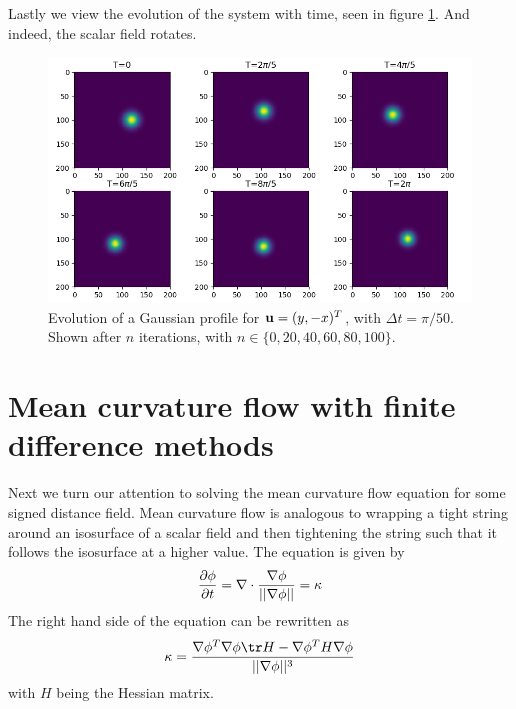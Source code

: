 \documentclass[sigconf]{acmart}
\begin{document}
Lastly we view the evolution of the system with time, seen in figure \ref{fig:semi_traj}. And indeed, the scalar field rotates.

\begin{figure}
	\includegraphics[width=\linewidth]{semi_lagrange_traj.png}
	\caption{Evolution of a Gaussian profile for $ \mathbf{u}=(y, -x)^T $, with $ \Delta t = \pi/50 $. Shown after $ n $ iterations, with $ n\in \{0, 20, 40, 60, 80, 100\} $.}
	\label{fig:semi_traj}
\end{figure}

\section{Mean curvature flow with finite difference methods}
Next we turn our attention to solving the mean curvature flow equation for some signed distance field. Mean curvature flow is analogous to wrapping a tight string around an isosurface of a scalar field and then tightening the string such that it follows the isosurface at a higher value. The equation is given by
\begin{equation}\label{key}
	\frac{\partial \phi}{\partial t} = \nabla \cdot \frac{\nabla \phi}{||\nabla \phi ||} = \kappa
\end{equation}
The right hand side of the equation can be rewritten as
\begin{equation}\label{key}
	\kappa = \frac{\grad \phi^T \grad \phi \tr H  - \grad\phi^T H \grad\phi}{||\grad\phi||^3}
\end{equation}
with $ H $ being the Hessian matrix.
\end{document}
